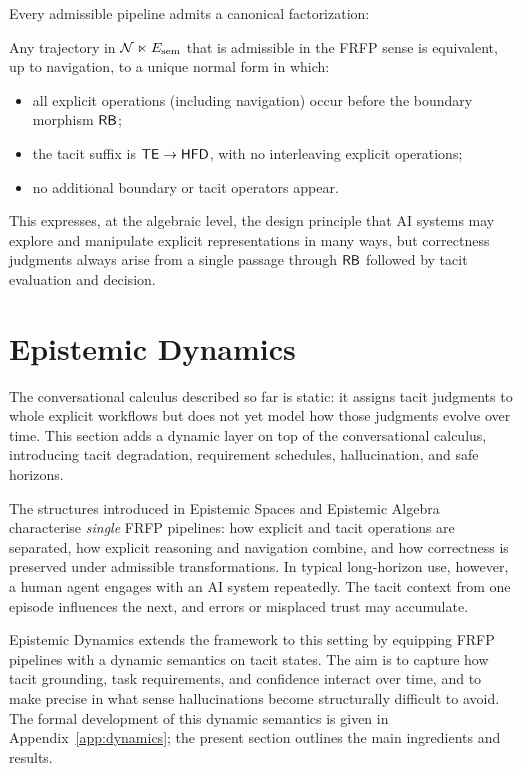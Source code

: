 Every admissible pipeline admits a canonical factorization:

\begin{theorem}
Any trajectory in \(\mathcal{N} \ltimes E_{\mathrm{sem}}\) that is admissible
in the FRFP sense is equivalent, up to navigation, to a unique normal
form in which:
\begin{itemize}[leftmargin=2em]
  \item all explicit operations (including navigation) occur before the
        boundary morphism \(\mathsf{RB}\);
  \item the tacit suffix is \(\mathsf{TE} \to \mathsf{HFD}\), with no interleaving
        explicit operations;
  \item no additional boundary or tacit operators appear.
\end{itemize}
\end{theorem}

This expresses, at the algebraic level, the design principle that AI
systems may explore and manipulate explicit representations in many
ways, but correctness judgments always arise from a single passage
through \(\mathsf{RB}\) followed by tacit evaluation and decision.

\section{Epistemic Dynamics}
\label{sec:epistemicdynamics}

The conversational calculus described so far is static: it assigns tacit judgments to whole explicit workflows but does not yet model how those judgments evolve over time. This section adds a dynamic layer on top of the conversational calculus, introducing tacit degradation, requirement schedules, hallucination, and safe horizons.

The structures introduced in Epistemic Spaces and Epistemic Algebra characterise \emph{single}
FRFP pipelines: how explicit and tacit operations are separated, how
explicit reasoning and navigation combine, and how correctness is
preserved under admissible transformations. In typical long-horizon use,
however, a human agent engages with an AI system repeatedly. The tacit context from one episode influences the next,
and errors or misplaced trust may accumulate.

Epistemic Dynamics extends the framework to this setting by equipping FRFP
pipelines with a dynamic semantics on tacit states. The aim is
to capture how tacit grounding, task requirements, and confidence
interact over time, and to make precise in what sense hallucinations
become structurally difficult to avoid. The formal development of this
dynamic semantics is given in Appendix~\ref{app:dynamics}; the
present section outlines the main ingredients and results.

